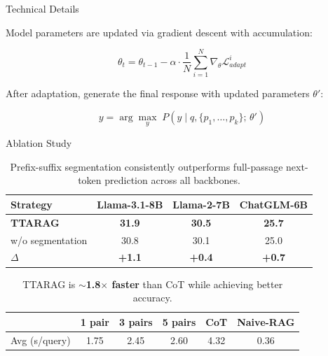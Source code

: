\documentclass[final]{beamer}
\newcommand{\sUp}[1]{{\color{sgreen}\textbf{#1}}}
\newlength{\colwidth}
\begin{document}
\begin{frame}[t]
\begin{columns}[t]
\begin{column}{\colwidth}
\begin{block}{Technical Details}

  Model parameters are updated via gradient descent with accumulation:

  \begin{equation}
    \theta_t = \theta_{t-1} - \alpha \cdot \frac{1}{N}\sum_{i=1}^{N} \nabla_\theta \mathcal{L}_{adapt}^{i}
  \end{equation}

  After adaptation, generate the final response with updated parameters $\theta'$:

  \begin{equation}
    y = \arg\max_y \; P\!\left(y \mid q, \{p_1, \ldots, p_k\};\, \theta'\right)
  \end{equation}

  \end{block}

  \begin{block}{Ablation Study}


  \begin{table}
    \centering
    \begin{tabular}{l|ccc}
      \toprule
      \textbf{Strategy} & \textbf{Llama-3.1-8B} & \textbf{Llama-2-7B} & \textbf{ChatGLM-6B} \\
      \midrule
      \textbf{TTARAG} & \textbf{31.9} & \textbf{30.5} & \textbf{25.7} \\
      w/o segmentation & 30.8 & 30.1 & 25.0 \\
      \midrule
      $\Delta$ & \sUp{+1.1} & \sUp{+0.4} & \sUp{+0.7} \\
      \bottomrule
    \end{tabular}
    \caption{Prefix-suffix segmentation consistently outperforms full-passage next-token prediction across all backbones.}
  \end{table}


  \begin{table}
    \centering
    \begin{tabular}{l|ccc|c|c}
      \toprule
      & \textbf{1 pair} & \textbf{3 pairs} & \textbf{5 pairs} & \textbf{CoT} & \textbf{Naive-RAG} \\
      \midrule
      Avg (s/query) & 1.75 & 2.45 & 2.60 & 4.32 & 0.36 \\
      \bottomrule
    \end{tabular}
    \caption{TTARAG is $\sim$\textbf{1.8$\times$ faster} than CoT while achieving better accuracy.}
  \end{table}


\end{block}
\end{column}
\end{columns}
\end{frame}
\end{document}
